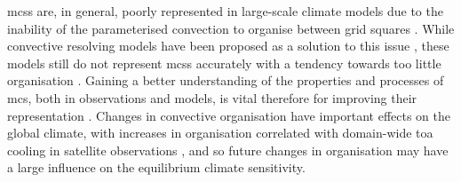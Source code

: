 \acrshort{mcs}s are, in general, poorly represented in large-scale climate models due to the inability of the parameterised convection to organise between grid squares \citep{houze_100_2018}.
While convective resolving models have been proposed as a solution to this issue \citep{stevens_added_2020}, these models still do not represent \acrshort{mcs}s accurately with a tendency towards too little organisation \citep{prein_sensitivity_2021}.
Gaining a better understanding of the properties and processes of \acrshort{mcs}, both in observations and models, is vital therefore for improving their representation \citep{feng_mesoscale_2023}.
Changes in convective organisation have important effects on the global climate, with increases in organisation correlated with domain-wide \acrshort{toa} cooling in satellite observations \citep{bony_observed_2020}, and so future changes in organisation may have a large influence on the equilibrium climate sensitivity.





